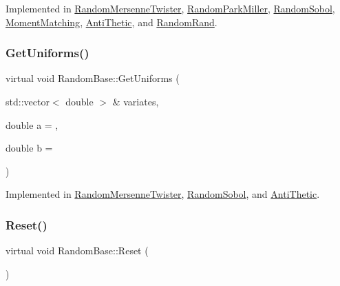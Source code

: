 Implemented in \hyperlink{classRandomMersenneTwister_afd574ab3efab7a722a230bfc5680dea8}{Random\+Mersenne\+Twister}, \hyperlink{classRandomParkMiller_a3dbbbb95c40e2a8794659fa38630b784}{Random\+Park\+Miller}, \hyperlink{classRandomSobol_ad4174c772925a5895828bcc87cc69fd6}{Random\+Sobol}, \hyperlink{classMomentMatching_ae07e9d85774d2ab2f4c877313e986892}{Moment\+Matching}, \hyperlink{classAntiThetic_affc5dff1f5783cb68f3933dd7b25c83a}{Anti\+Thetic}, and \hyperlink{classRandomRand_acd17f14742903f5b88f9b1175f16098c}{Random\+Rand}.

\hypertarget{classRandomBase_a3bbf85695dbb1a9462a2b6c3f10af969}{}\label{classRandomBase_a3bbf85695dbb1a9462a2b6c3f10af969} 
\subsubsection{\texorpdfstring{Get\+Uniforms()}{GetUniforms()}\hspace{0.1cm}{\footnotesize\ttfamily [2/2]}}
{\footnotesize\ttfamily virtual void Random\+Base\+::\+Get\+Uniforms (\begin{DoxyParamCaption}\item[{std\+::vector$<$ double $>$ \&}]{variates,  }\item[{double}]{a = {},  }\item[{double}]{b = {} }\end{DoxyParamCaption})\hspace{0.3cm}{\ttfamily [pure virtual]}}



Implemented in \hyperlink{classRandomMersenneTwister_a6ee46c33d00d07921765033a9b0c471a}{Random\+Mersenne\+Twister}, \hyperlink{classRandomSobol_ab358820392404ae723a0148d4d014553}{Random\+Sobol}, and \hyperlink{classAntiThetic_a189ea07e81121c1ae4f3c655ec405487}{Anti\+Thetic}.

\hypertarget{classRandomBase_a6e35c1467b37fc8c5e262297223685eb}{}\label{classRandomBase_a6e35c1467b37fc8c5e262297223685eb} 
\subsubsection{\texorpdfstring{Reset()}{Reset()}}
{\footnotesize\ttfamily virtual void Random\+Base\+::\+Reset (\begin{DoxyParamCaption}{ }\end{DoxyParamCaption})\hspace{0.3cm}{\ttfamily [pure virtual]}}



